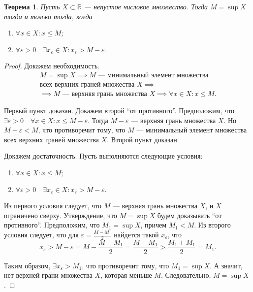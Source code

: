 \documentclass[a4paper,12pt]{article} %
\newtheorem{theorem}{Теорема}[section]
\theoremstyle{remark}
\theoremstyle{definition}
\begin{document}
\begin{theorem}
    Пусть $X\subset \mathbb{R}$ --- непустое числовое множество. Тогда $M = \sup X$ тогда и только тогда, когда
    \begin{enumerate}
        \item $\forall x \in X : x \le M$;
        \item $\forall \varepsilon>0 \quad \exists x_\varepsilon \in X : x_\varepsilon > M - \varepsilon$.
    \end{enumerate}
    \begin{center}
    \end{center}
\end{theorem}
\begin{proof}
    Докажем необходимость. 
    \begin{multline}
        M = \sup X \implies M \text{ --- минимальный элемент множества } \\
        \text{всех верхних граней множества } X \implies \\
        \implies M \text{ --- верхняя грань множества } X \implies \forall x\in X : x \le M.
    \end{multline}

    Первый пункт доказан. Докажем второй ``от противного''. Предположим, что $\exists \varepsilon>0 \quad 
    \forall x \in X : x \le M - \varepsilon$. Тогда $M - \varepsilon$ --- верхняя грань множества $X$.
    Но $M - \varepsilon < M$, что противоречит тому, что $M$ --- минимальный элемент множества всех верхних граней
    множества $X$. Второй пункт доказан.

    Докажем достаточность.
    Пусть выполняются следующие условия:
    \begin{enumerate}
        \item $\forall x \in X : x \le M$;
        \item $\forall \varepsilon>0 \quad \exists x_\varepsilon \in X: x_\varepsilon > M - \varepsilon$.
    \end{enumerate}

    Из первого условия следует, что $M$ --- верхняя грань множества $X$, и $X$ ограничено сверху.
    Утверждение, что $M=\sup X$ будем доказывать ``от противного''. Предположим, что $M_1 = \sup X$, причем $M_1 < M$.
    Из второго условия следует, что для $\varepsilon = \frac{M-M_1}{2}$ найдется такой $x_\varepsilon$,
    что
    \[x_\varepsilon > M - \varepsilon = M - \frac{M-M_1}{2} = \frac{M + M_1}{2} > \frac{M_1+M_1}{2} = M_1.\]

    Таким образом, $\exists x_\varepsilon > M_1$, что противоречит тому, что $M_1 = \sup X$. А значит, нет верхней грани множества $X$, которая меньше $M$. Следовательно, $M = \sup X$.
\end{proof}
\end{document}
